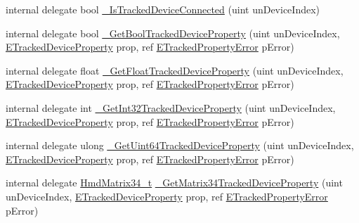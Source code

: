 \begin{DoxyCompactItemize}
\item 
internal delegate bool \mbox{\hyperlink{struct_valve_1_1_v_r_1_1_i_v_r_system_a879d599690d8f4f52620923b283b85c6}{\+\_\+\+Is\+Tracked\+Device\+Connected}} (uint un\+Device\+Index)
\item 
internal delegate bool \mbox{\hyperlink{struct_valve_1_1_v_r_1_1_i_v_r_system_ad59f0298d859db814984c5b2c46e2a1c}{\+\_\+\+Get\+Bool\+Tracked\+Device\+Property}} (uint un\+Device\+Index, \mbox{\hyperlink{namespace_valve_1_1_v_r_ab060521ead7273986988fc4897e52482}{E\+Tracked\+Device\+Property}} prop, ref \mbox{\hyperlink{namespace_valve_1_1_v_r_aab6684f03930a2d2cf22ed66b437e47b}{E\+Tracked\+Property\+Error}} p\+Error)
\item 
internal delegate float \mbox{\hyperlink{struct_valve_1_1_v_r_1_1_i_v_r_system_a463f30e32dfce512ceed667f548e83ed}{\+\_\+\+Get\+Float\+Tracked\+Device\+Property}} (uint un\+Device\+Index, \mbox{\hyperlink{namespace_valve_1_1_v_r_ab060521ead7273986988fc4897e52482}{E\+Tracked\+Device\+Property}} prop, ref \mbox{\hyperlink{namespace_valve_1_1_v_r_aab6684f03930a2d2cf22ed66b437e47b}{E\+Tracked\+Property\+Error}} p\+Error)
\item 
internal delegate int \mbox{\hyperlink{struct_valve_1_1_v_r_1_1_i_v_r_system_a0201a1804a9833cfe2834c810ee97893}{\+\_\+\+Get\+Int32\+Tracked\+Device\+Property}} (uint un\+Device\+Index, \mbox{\hyperlink{namespace_valve_1_1_v_r_ab060521ead7273986988fc4897e52482}{E\+Tracked\+Device\+Property}} prop, ref \mbox{\hyperlink{namespace_valve_1_1_v_r_aab6684f03930a2d2cf22ed66b437e47b}{E\+Tracked\+Property\+Error}} p\+Error)
\item 
internal delegate ulong \mbox{\hyperlink{struct_valve_1_1_v_r_1_1_i_v_r_system_a2cd6c3c2bdb9cbf7ee06115283aa3640}{\+\_\+\+Get\+Uint64\+Tracked\+Device\+Property}} (uint un\+Device\+Index, \mbox{\hyperlink{namespace_valve_1_1_v_r_ab060521ead7273986988fc4897e52482}{E\+Tracked\+Device\+Property}} prop, ref \mbox{\hyperlink{namespace_valve_1_1_v_r_aab6684f03930a2d2cf22ed66b437e47b}{E\+Tracked\+Property\+Error}} p\+Error)
\item 
internal delegate \mbox{\hyperlink{struct_valve_1_1_v_r_1_1_hmd_matrix34__t}{Hmd\+Matrix34\+\_\+t}} \mbox{\hyperlink{struct_valve_1_1_v_r_1_1_i_v_r_system_add3a6aac11e39d31852a68b40434aa72}{\+\_\+\+Get\+Matrix34\+Tracked\+Device\+Property}} (uint un\+Device\+Index, \mbox{\hyperlink{namespace_valve_1_1_v_r_ab060521ead7273986988fc4897e52482}{E\+Tracked\+Device\+Property}} prop, ref \mbox{\hyperlink{namespace_valve_1_1_v_r_aab6684f03930a2d2cf22ed66b437e47b}{E\+Tracked\+Property\+Error}} p\+Error)

\end{DoxyCompactItemize}
